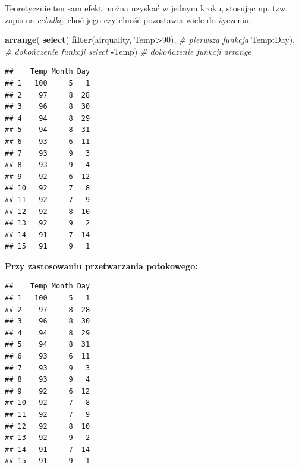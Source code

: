 \documentclass[]{book}
\newenvironment{Shaded}{\begin{snugshade}}{\end{snugshade}}
\newcommand{\KeywordTok}[1]{\textcolor[rgb]{0.13,0.29,0.53}{\textbf{#1}}}
\newcommand{\DecValTok}[1]{\textcolor[rgb]{0.00,0.00,0.81}{#1}}
\newcommand{\StringTok}[1]{\textcolor[rgb]{0.31,0.60,0.02}{#1}}
\newcommand{\CommentTok}[1]{\textcolor[rgb]{0.56,0.35,0.01}{\textit{#1}}}
\newcommand{\OperatorTok}[1]{\textcolor[rgb]{0.81,0.36,0.00}{\textbf{#1}}}
\newcommand{\NormalTok}[1]{#1}
\theoremstyle{definition}
\theoremstyle{definition}
\theoremstyle{definition}
\theoremstyle{remark}
\begin{document}
Teoretycznie ten sam efekt można uzyskać w jednym kroku, stosując np.
tzw. zapis na \emph{cebulkę}, choć jego czytelność pozostawia wiele do
życzenia:

\begin{Shaded}
\begin{Highlighting}[]
  \KeywordTok{arrange}\NormalTok{(}
    \KeywordTok{select}\NormalTok{( }
      \KeywordTok{filter}\NormalTok{(airquality, Temp}\OperatorTok{>}\DecValTok{90}\NormalTok{), }\CommentTok{# pierwsza funkcja }
\NormalTok{    Temp}\OperatorTok{:}\NormalTok{Day), }\CommentTok{# dokończenie funkcji select}
 \OperatorTok{-}\NormalTok{Temp) }\CommentTok{# dokończenie funkcji arrange}
\end{Highlighting}
\end{Shaded}

\begin{verbatim}
##    Temp Month Day
## 1   100     5   1
## 2    97     8  28
## 3    96     8  30
## 4    94     8  29
## 5    94     8  31
## 6    93     6  11
## 7    93     9   3
## 8    93     9   4
## 9    92     6  12
## 10   92     7   8
## 11   92     7   9
## 12   92     8  10
## 13   92     9   2
## 14   91     7  14
## 15   91     9   1
\end{verbatim}

\textbf{Przy zastosowaniu przetwarzania potokowego:}

\begin{Shaded}
\end{Shaded}

\begin{verbatim}
##    Temp Month Day
## 1   100     5   1
## 2    97     8  28
## 3    96     8  30
## 4    94     8  29
## 5    94     8  31
## 6    93     6  11
## 7    93     9   3
## 8    93     9   4
## 9    92     6  12
## 10   92     7   8
## 11   92     7   9
## 12   92     8  10
## 13   92     9   2
## 14   91     7  14
## 15   91     9   1
\end{verbatim}

\begin{Shaded}
\end{Shaded}
\end{document}
